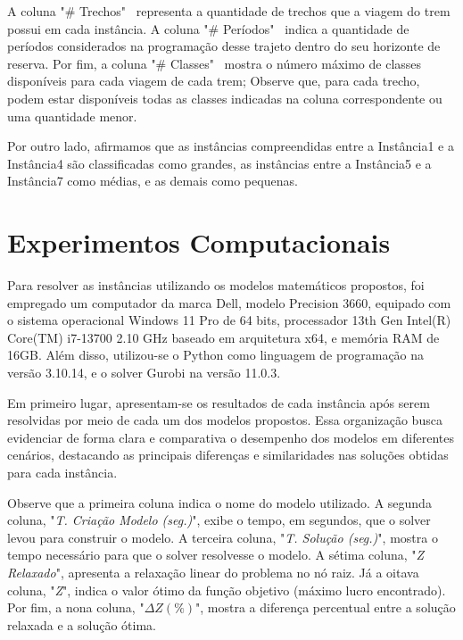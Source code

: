 A coluna "\# Trechos" \, representa a quantidade de trechos que a viagem do trem possui em cada instância. A coluna "\# Períodos" \, indica a quantidade de períodos considerados na programação desse trajeto dentro do seu horizonte de reserva. Por fim, a coluna "\# Classes" \, mostra o número máximo de classes disponíveis para cada viagem de cada trem; Observe que, para cada trecho, podem estar disponíveis todas as classes indicadas na coluna correspondente ou uma quantidade menor.

Por outro lado, afirmamos que as instâncias compreendidas entre a Instância1 e a Instância4 são classificadas como grandes, as instâncias entre a Instância5 e a Instância7 como médias, e as demais como pequenas.

\section{Experimentos Computacionais}
Para resolver as instâncias utilizando os modelos matemáticos propostos, foi empregado um computador da marca Dell, modelo Precision 3660, equipado com o sistema operacional Windows 11 Pro de 64 bits, processador 13th Gen Intel(R) Core(TM) i7-13700 2.10 GHz baseado em arquitetura x64, e memória RAM de 16GB. Além disso, utilizou-se o Python como linguagem de programação na versão 3.10.14, e o solver Gurobi na versão 11.0.3.

Em primeiro lugar, apresentam-se os resultados de cada instância após serem resolvidas por meio de cada um dos modelos propostos. Essa organização busca evidenciar de forma clara e comparativa o desempenho dos modelos em diferentes cenários, destacando as principais diferenças e similaridades nas soluções obtidas para cada instância.

Observe que a primeira coluna indica o nome do modelo utilizado. A segunda coluna, "\textit{T. Criação Modelo (seg.)}", exibe o tempo, em segundos, que o solver levou para construir o modelo. A terceira coluna, "\textit{T. Solução (seg.)}", mostra o tempo necessário para que o solver resolvesse o modelo. A sétima coluna, "\textit{Z Relaxado}", apresenta a relaxação linear do problema no nó raiz. Já a oitava coluna, "\textit{Z\*}", indica o valor ótimo da função objetivo (máximo lucro encontrado). Por fim, a nona coluna, "\textit{$ \Delta Z (\%)$}", mostra a diferença percentual entre a solução relaxada e a solução ótima.

